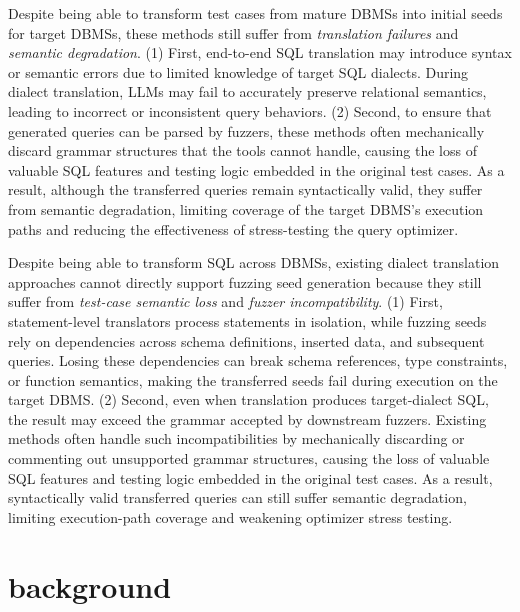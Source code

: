 Despite being able to transform test cases from mature DBMSs into initial seeds for target DBMSs, these methods still suffer from \textit{translation failures} and \textit{semantic degradation}.
(1) First, end-to-end SQL translation may introduce syntax or semantic errors due to limited knowledge of target SQL dialects. During dialect translation, LLMs may fail to accurately preserve relational semantics, leading to incorrect or inconsistent query behaviors. 
(2) Second, to ensure that generated queries can be parsed by fuzzers, these methods often mechanically discard grammar structures that the tools cannot handle, causing the loss of valuable SQL features and testing logic embedded in the original test cases. As a result, although the transferred queries remain syntactically valid, they suffer from semantic degradation, limiting coverage of the target DBMS’s execution paths and reducing the effectiveness of stress-testing the query optimizer.

Despite being able to transform SQL across DBMSs, existing dialect translation approaches cannot directly support fuzzing seed generation because they still 
suffer from 
\textit{test-case semantic loss} and \textit{fuzzer incompatibility}.
(1) First, statement-level translators process statements in isolation, while fuzzing seeds rely on dependencies across schema definitions, inserted data, and subsequent queries. Losing these dependencies can break schema references, type constraints, or function semantics, making the transferred seeds fail during execution on the target DBMS.
(2) Second, even when translation produces target-dialect SQL, the result may exceed the grammar accepted by downstream fuzzers. Existing methods often handle such incompatibilities by mechanically discarding or commenting out unsupported grammar structures, causing the loss of valuable SQL features and testing logic embedded in the original test cases. As a result, syntactically valid transferred queries can still suffer semantic degradation, limiting execution-path coverage and weakening optimizer stress testing.

\section{background}

